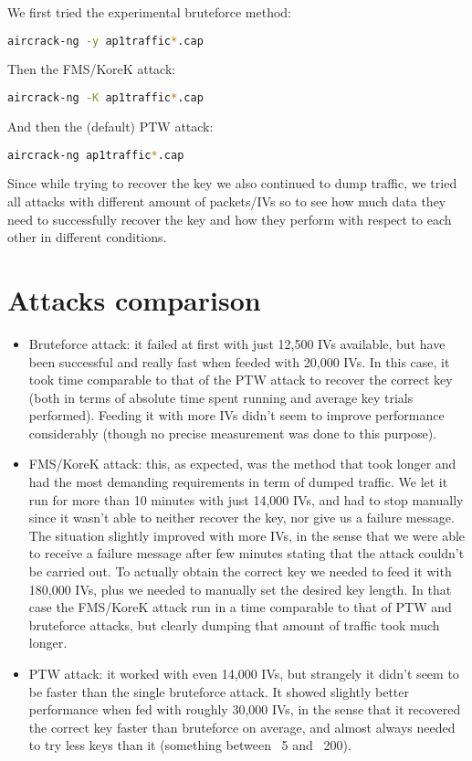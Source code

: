 \documentclass[a4paper,12pt,titlepage]{article}
\begin{document}
We first tried the experimental bruteforce method:

\begin{lstlisting}[language=bash]
aircrack-ng -y ap1traffic*.cap
\end{lstlisting}

Then the FMS/KoreK attack:
\begin{lstlisting}[language=bash]
aircrack-ng -K ap1traffic*.cap
\end{lstlisting}

And then the (default) PTW attack:
\begin{lstlisting}[language=bash]
aircrack-ng ap1traffic*.cap
\end{lstlisting}

Since while trying to recover the key we also continued to dump traffic, we
tried all attacks with different amount of packets/IVs so to see how much data
they need to successfully recover the key and how they perform with respect to
each other in different conditions.

\section{Attacks comparison}
\begin{itemize}
	\item Bruteforce attack: it failed at first with just 12,500 IVs available, but have
        been successful and really fast when feeded with 20,000 IVs. In this case, it
        took time comparable to that of the PTW attack to recover the correct key
        (both in terms of absolute time spent running and average key trials
        performed). Feeding it with more IVs didn't seem to improve performance
        considerably (though no precise measurement was done to this purpose).
  \item FMS/KoreK attack: this, as expected, was the method that took longer and had
        the most demanding requirements in term of dumped traffic. We let it run for
        more than 10 minutes with just 14,000 IVs, and had to stop manually since it
        wasn't able to neither recover the key, nor give us a failure message. \\
        The situation slightly improved with more IVs, in the sense that we were able
        to receive a failure message after few minutes stating that the attack
        couldn't be carried out. To actually obtain the correct key we needed to feed
        it with 180,000 IVs, plus we needed to manually set the desired key length.
        In that case the FMS/KoreK attack run in a time comparable to that of PTW and
        bruteforce attacks, but clearly dumping that amount of traffic took much
        longer.
	\item PTW attack: it worked with even 14,000 IVs, but strangely it didn't seem to
        be faster than the single bruteforce attack. It showed slightly better
        performance when fed with roughly 30,000 IVs, in the sense that it recovered
        the correct key faster than bruteforce on average, and almost always needed
        to try less keys than it (something between ~5 and ~200).
\end{itemize}        
\end{document}
